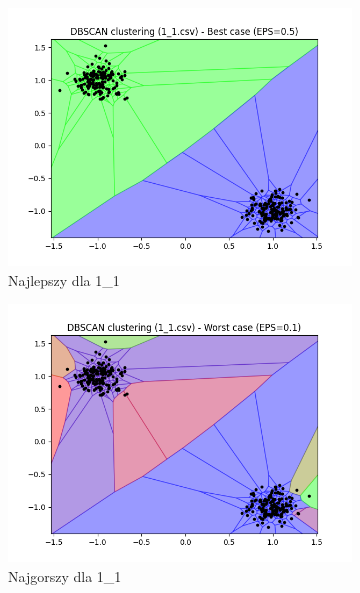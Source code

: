 \documentclass[12pt]{article}
\begin{document}
\begin{figure}[H]
    \centering
    \begin{subfigure}[b]{0.24\textwidth}
        \includegraphics[width=\linewidth]{img/exp_1/dbscan/1_1_best.png}
        \caption{Najlepszy dla 1\_1}
    \end{subfigure}
    \hfill
    \begin{subfigure}[b]{0.24\textwidth}
        \includegraphics[width=\linewidth]{img/exp_1/dbscan/1_1_worst.png}
        \caption{Najgorszy dla 1\_1}
    \end{subfigure}
    \hfill
    \begin{subfigure}[b]{0.24\textwidth}

\end{subfigure}
\end{figure}
\end{document}
